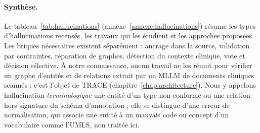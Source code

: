 \paragraph{Synthèse.} Le tableau~\ref{tab:hallucinations} (annexe~\ref{annexe:hallucinations}) résume les types d'hallucinations recensés, les travaux qui les étudient et les approches proposées. Les briques nécessaires existent séparément : ancrage dans la source, validation par contraintes, réparation de graphes, détection du contexte clinique, vote et décision sélective. À notre connaissance, aucun travail ne les réunit pour vérifier un graphe d'entités et de relations extrait par un MLLM de documents cliniques scannés : c'est l'objet de TRACE (chapitre~\ref{chap:architecture}). Nous y appelons hallucination \emph{terminologique} une entité d'un type non conforme ou une relation hors signature du schéma d'annotation ; elle se distingue d'une erreur de normalisation, qui associe une entité à un mauvais code ou concept d'un vocabulaire comme l'UMLS, non traitée ici.

